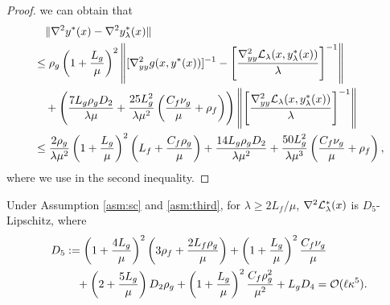 \begin{proof}
we can obtain that
{
\begin{align*}
    &\quad \Vert \nabla^2 y^*(x) - \nabla^2 y_{\lambda}^*(x) \Vert  \\
    &\le \rho_g \left( 1 + \frac{L_g}{\mu}\right)^2 \left \Vert [\nabla_{yy}^2 g(x,y^*(x))]^{-1} - \left [  \frac{\nabla_{yy}^2 {\mathcal{L}}_{\lambda}(x,y_{\lambda}^*(x))}{\lambda} \right]^{-1}  \right \Vert \\
    &\quad + \left( \frac{7L_g \rho_g D_2}{\lambda \mu} + \frac{25L_g^2 }{\lambda \mu^2} \left( \frac{C_f \nu_g}{\mu} + \rho_f \right) \right) \left \Vert \left [  \frac{\nabla_{yy}^2 {\mathcal{L}}_{\lambda}(x,y_{\lambda}^*(x))}{\lambda} \right]^{-1} \right \Vert \\
    &\le \frac{2\rho_g}{\lambda \mu^2}  \left( 1 + \frac{L_g}{\mu}\right)^2  \left(L_f + 
     \frac{C_f \rho_g}{\mu}
     \right) +   \frac{14 L_g \rho_g D_2}{\lambda \mu^2} + \frac{50 L_g^2 }{\lambda \mu^3} \left( \frac{C_f \nu_g}{\mu} + \rho_f \right) ,
\end{align*}}
where we use  in the second inequality.
\end{proof}

\begin{lem} \label{lem:nabla3-bound}
Under Assumption \ref{asm:sc} and \ref{asm:third}, for $ \lambda \ge 2 L_f /\mu$, 
$\nabla^2 {\mathcal{L}}_{\lambda}^*(x) $ is $D_5$-Lipschitz,
 where
\begin{align*}
    D_5 &:=  \left( 1 + \frac{4L_g}{\mu} \right)^2 \left( 3\rho_f  + \frac{2 L_f \rho_g}{\mu} \right) + \left(1 + \frac{L_g}{\mu} \right)^2 \frac{C_f \nu_g}{\mu} \\
    &\quad + \left(2+ \frac{5L_g}{\mu} \right) D_2 \rho_g +  \left( 1+ \frac{L_g}{\mu} \right)^2 \frac{C_f \rho_g^2}{\mu^2} + L_g D_4   = {\mathcal{O}}(\ell \kappa^5).
\end{align*}
\end{lem}

